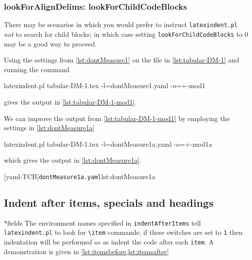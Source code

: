 \subsubsection{lookForAlignDelims: lookForChildCodeBlocks}\label{sec:lookForChildCodeBlocks}
 There  may be scenarios in
 which you would prefer to instruct \texttt{latexindent.pl} \emph{not} to search for
 child blocks; in which case setting \texttt{lookForChildCodeBlocks} to 0 may be a good
 way to proceed.

 \begin{example}
 Using the settings from \vref{lst:dontMeasure1} on the file in \cref{lst:tabular-DM-1}
 and running the command

 \begin{commandshell}
latexindent.pl tabular-DM-1.tex -l=dontMeasure1.yaml -o=+-mod1
\end{commandshell}

 gives the output in \cref{lst:tabular-DM-1-mod1}.
 \begin{cmhtcbraster}
 \end{cmhtcbraster}

 We can improve the output from \cref{lst:tabular-DM-1-mod1} by employing the settings in
 \cref{lst:dontMeasure1a}

 \begin{commandshell}
latexindent.pl tabular-DM-1.tex -l=dontMeasure1a.yaml -o=+-mod1a
\end{commandshell}

 which gives the output in \cref{lst:dontMeasure1a}.

 \begin{cmhtcbraster}
  [yaml-TCB]{\texttt{dontMeasure1a.yaml}}{lst:dontMeasure1a}
 \end{cmhtcbraster}
 \end{example}

\subsection{Indent after items, specials and headings}
*{fields}
 The environment names specified in \texttt{indentAfterItems} tell
 \texttt{latexindent.pl} to look for \lstinline!\item! commands; if these switches are
 set to \texttt{1} then indentation will be performed so as indent the code after each
 \texttt{item}. A demonstration is given in \cref{lst:itemsbefore,lst:itemsafter}

